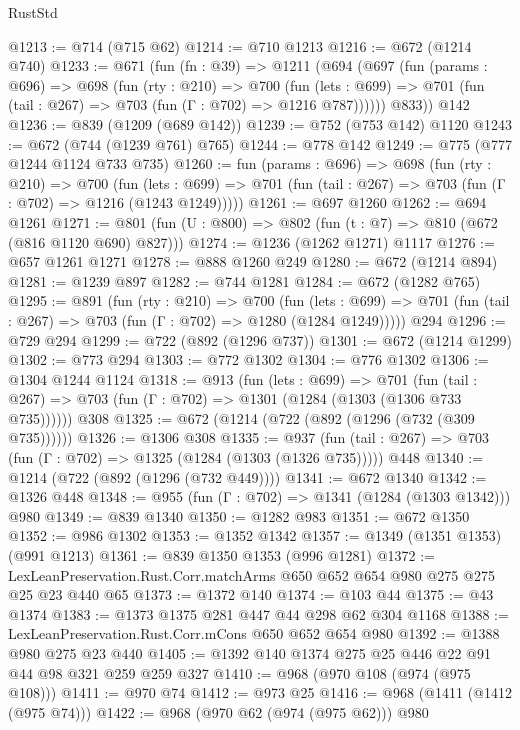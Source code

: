 \begin{lexlean}{RustStd}
\begin{coremodule}
@1213 := @714 (@715 @62)
@1214 := @710 @1213
@1216 := @672 (@1214 @740)
@1233 := @671
    (fun (fn : @39) =>
    @1211
      (@694
        (@697
          (fun (params : @696) =>
          @698
            (fun (rty : @210) =>
            @700
              (fun (lets : @699) =>
              @701 (fun (tail : @267) => @703 (fun (Γ : @702) => @1216 @787))))))
        @833))
    @142
@1236 := @839 (@1209 (@689 @142))
@1239 := @752 (@753 @142) @1120
@1243 := @672 (@744 (@1239 @761) @765)
@1244 := @778 @142
@1249 := @775 (@777 @1244 @1124 @733 @735)
@1260 := fun (params : @696) =>
  @698
    (fun (rty : @210) =>
    @700
      (fun (lets : @699) =>
      @701 (fun (tail : @267) => @703 (fun (Γ : @702) => @1216 (@1243 @1249)))))
@1261 := @697 @1260
@1262 := @694 @1261
@1271 := @801 (fun (U : @800) => @802 (fun (t : @7) => @810 (@672 (@816 @1120 @690) @827)))
@1274 := @1236 (@1262 @1271) @1117
@1276 := @657 @1261 @1271
@1278 := @888 @1260 @249
@1280 := @672 (@1214 @894)
@1281 := @1239 @897
@1282 := @744 @1281
@1284 := @672 (@1282 @765)
@1295 := @891
    (fun (rty : @210) =>
    @700
      (fun (lets : @699) =>
      @701 (fun (tail : @267) => @703 (fun (Γ : @702) => @1280 (@1284 @1249)))))
    @294
@1296 := @729 @294
@1299 := @722 (@892 (@1296 @737))
@1301 := @672 (@1214 @1299)
@1302 := @773 @294
@1303 := @772 @1302
@1304 := @776 @1302
@1306 := @1304 @1244 @1124
@1318 := @913
    (fun (lets : @699) =>
    @701 (fun (tail : @267) => @703 (fun (Γ : @702) => @1301 (@1284 (@1303 (@1306 @733 @735))))))
    @308
@1325 := @672 (@1214 (@722 (@892 (@1296 (@732 (@309 @735))))))
@1326 := @1306 @308
@1335 := @937
    (fun (tail : @267) => @703 (fun (Γ : @702) => @1325 (@1284 (@1303 (@1326 @735)))))
    @448
@1340 := @1214 (@722 (@892 (@1296 (@732 @449))))
@1341 := @672 @1340
@1342 := @1326 @448
@1348 := @955 (fun (Γ : @702) => @1341 (@1284 (@1303 @1342))) @980
@1349 := @839 @1340
@1350 := @1282 @983
@1351 := @672 @1350
@1352 := @986 @1302
@1353 := @1352 @1342
@1357 := @1349 (@1351 @1353) (@991 @1213)
@1361 := @839 @1350 @1353 (@996 @1281)
@1372 := LexLeanPreservation.Rust.Corr.matchArms @650 @652 @654 @980 @275 @275 @25 @23 @440 @65
@1373 := @1372 @140
@1374 := @103 @44
@1375 := @43 @1374
@1383 := @1373 @1375 @281 @447 @44 @298 @62 @304 @1168
@1388 := LexLeanPreservation.Rust.Corr.mCons @650 @652 @654 @980
@1392 := @1388 @980 @275 @23 @440
@1405 := @1392 @140 @1374 @275 @25 @446 @22 @91 @44 @98 @321 @259 @259 @327
@1410 := @968 (@970 @108 (@974 (@975 @108)))
@1411 := @970 @74
@1412 := @973 @25
@1416 := @968 (@1411 (@1412 (@975 @74)))
@1422 := @968 (@970 @62 (@974 (@975 @62))) @980

\end{coremodule}
\end{lexlean}
